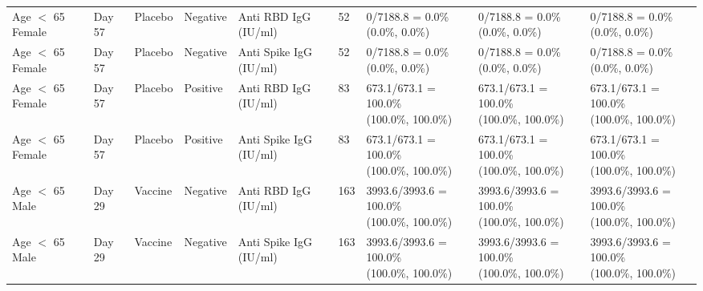 \documentclass[]{book}
\theoremstyle{definition}
\theoremstyle{definition}
\theoremstyle{definition}
\newcommand{\1}{\mathbbm{1}}
\begin{document}
\begin{landscape}
\begin{ThreePartTable}
\begin{longtable}[t]{>{\raggedright\arraybackslash}p{2.7cm}llllllll}
\hspace{1em}Age $<$ 65 Female & Day 57 & Placebo & Negative & Anti RBD IgG (IU/ml) & 52 & \makecell[l]{0/7188.8 = 0.0\%\\(0.0\%, 0.0\%)} & \makecell[l]{0/7188.8 = 0.0\%\\(0.0\%, 0.0\%)} & \makecell[l]{0/7188.8 = 0.0\%\\(0.0\%, 0.0\%)}\\
\hspace{1em}Age $<$ 65 Female & Day 57 & Placebo & Negative & Anti Spike IgG (IU/ml) & 52 & \makecell[l]{0/7188.8 = 0.0\%\\(0.0\%, 0.0\%)} & \makecell[l]{0/7188.8 = 0.0\%\\(0.0\%, 0.0\%)} & \makecell[l]{0/7188.8 = 0.0\%\\(0.0\%, 0.0\%)}\\
\hspace{1em}Age $<$ 65 Female & Day 57 & Placebo & Positive & Anti RBD IgG (IU/ml) & 83 & \makecell[l]{673.1/673.1 = 100.0\%\\(100.0\%, 100.0\%)} & \makecell[l]{673.1/673.1 = 100.0\%\\(100.0\%, 100.0\%)} & \makecell[l]{673.1/673.1 = 100.0\%\\(100.0\%, 100.0\%)}\\
\hspace{1em}Age $<$ 65 Female & Day 57 & Placebo & Positive & Anti Spike IgG (IU/ml) & 83 & \makecell[l]{673.1/673.1 = 100.0\%\\(100.0\%, 100.0\%)} & \makecell[l]{673.1/673.1 = 100.0\%\\(100.0\%, 100.0\%)} & \makecell[l]{673.1/673.1 = 100.0\%\\(100.0\%, 100.0\%)}\\
\hspace{1em}Age $<$ 65 Male & Day 29 & Vaccine & Negative & Anti RBD IgG (IU/ml) & 163 & \makecell[l]{3993.6/3993.6 = 100.0\%\\(100.0\%, 100.0\%)} & \makecell[l]{3993.6/3993.6 = 100.0\%\\(100.0\%, 100.0\%)} & \makecell[l]{3993.6/3993.6 = 100.0\%\\(100.0\%, 100.0\%)}\\
\hspace{1em}Age $<$ 65 Male & Day 29 & Vaccine & Negative & Anti Spike IgG (IU/ml) & 163 & \makecell[l]{3993.6/3993.6 = 100.0\%\\(100.0\%, 100.0\%)} & \makecell[l]{3993.6/3993.6 = 100.0\%\\(100.0\%, 100.0\%)} & \makecell[l]{3993.6/3993.6 = 100.0\%\\(100.0\%, 100.0\%)}\\

\end{longtable}
\end{ThreePartTable}
\end{landscape}
\end{document}
